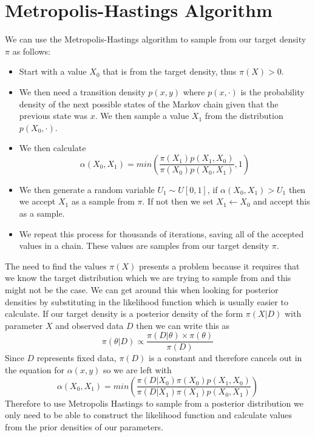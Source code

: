 \documentclass{amsbook}
\begin{document}
\section{Metropolis-Hastings Algorithm}
We can use the Metropolis-Hastings algorithm to sample from our target density $\pi$ as follows:
\begin{itemize}
\item Start with a value $X_0$ that is from the target density, thus $\pi(X) > 0$.
\item We then need a transition density $p(x,y)$ where $p(x, \cdot)$ is the probability density of the next possible states of the Markov chain given that the previous state was $x$. We then sample a value $X_1$ from the distribution $p(X_0,\cdot)$.
\item We then calculate 
\[ \alpha(X_0,X_1) = min\left(\frac{\pi(X_1)p(X_1,X_0)}{\pi(X_0)p(X_0,X_1)},1\right) \]
\item We then generate a random variable $U_1 \sim U[0,1]$, if $\alpha(X_0,X_1) > U_1$ then we accept $X_1$ as a sample from $\pi$. If not then we set $X_1 \leftarrow X_0$ and accept this as a sample.
\item We repeat this process for thousands of iterations, saving all of the accepted values in a chain. These values are samples from our target density $\pi$.
\end{itemize}
The need to find the values $\pi(X)$ presents a problem because it requires that we know the target distribution which we are trying to sample from and this might not be the case. We can get around this when looking for posterior densities by substituting in the likelihood function which is usually easier to calculate. If our target density is a posterior density of the form $\pi(X | D)$ with parameter $X$ and observed data $D$ then we can write this as
\[ \pi(\theta | D) \propto \frac{\pi(D | \theta) \times \pi(\theta)}{\pi(D)} \]
Since $D$ represents fixed data, $\pi(D)$ is a constant and therefore cancels out in the equation for $\alpha(x,y)$ so we are left with
\[ \alpha(X_0,X_1) = min\left(\frac{\pi(D | X_0)\pi(X_0)p(X_1,X_0)}{\pi(D | X_1)\pi(X_1)p(X_0,X_1)}\right) \]
Therefore to use Metropolis Hastings to sample from a posterior distribution we only need to be able to construct the likelihood function and calculate values from the prior densities of our parameters.
\end{document}
